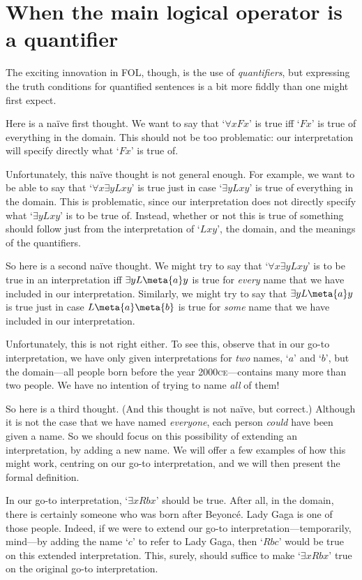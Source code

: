 \section{When the main logical operator is a quantifier}
The exciting innovation in FOL, though, is the use of \emph{quantifiers}, but expressing the truth conditions for quantified sentences is a bit more fiddly than one might first expect. 

Here is a na\"{i}ve first thought. We want to say that `$\forall x Fx$' is true iff `$Fx$' is true of everything in the domain. This should not be too problematic: our interpretation will specify directly what `$Fx$' is true of. 

Unfortunately, this na\"{i}ve thought is not general enough. For example, we want to be able to say that `$\forall x \exists y Lxy$' is true just in case `$\exists y Lxy$' is true of everything in the domain. This is problematic, since our interpretation does not directly specify what `$\exists y Lxy$' is to be true of. Instead, whether or not this is true of something should follow just from the interpretation of `$Lxy$', the domain, and the meanings of the quantifiers. 

So here is a second na\"{i}ve thought. We might try to say that `$\forall x \exists y Lxy$' is to be true in an interpretation iff $\exists y L\meta{a}y$ is true for \emph{every} name  that we have included in our interpretation. Similarly, we might try to say that $\exists y L\meta{a}y$ is true just in case $L\meta{a}\meta{b}$ is true for \emph{some} name  that we have included in our interpretation.

Unfortunately, this is not right either. To see this, observe that in our go-to interpretation, we have only given interpretations for \emph{two} names, `$a$' and `$b$', but the domain---all people born before the year 2000\textsc{ce}---contains many more than two people. We have no intention of trying to name \emph{all} of them!

So here is a third thought. (And this thought is not na\"{i}ve, but correct.) Although it is not the case that we have named \emph{everyone}, each person \emph{could} have been given a name. So we should focus on this possibility of extending an interpretation, by adding a new name. We will offer a few examples of how this might work, centring on our go-to interpretation, and we will then present the formal definition. 

In our go-to interpretation, `$\exists x Rbx$' should be true. After all, in the domain, there is certainly someone who was born after Beyonc\'e. Lady Gaga is one of those people. Indeed, if we were to extend our go-to interpretation---temporarily, mind---by adding the name `$c$' to refer to Lady Gaga, then `$Rbc$' would be true on this extended interpretation. This, surely, should suffice to make `$\exists x Rbx$' true on the original go-to interpretation. 

